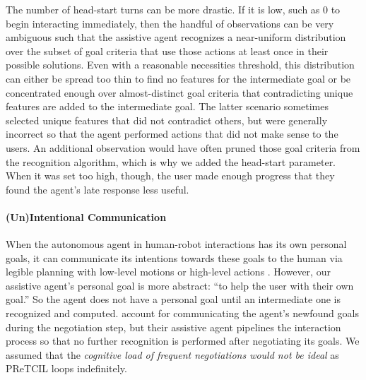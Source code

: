 \documentclass[letterpaper]{article} %
\begin{document}
The number of head-start turns can be more drastic.  If it is low, such as $0$ to begin interacting immediately, then the handful of observations can be very ambiguous such that the assistive agent recognizes a near-uniform distribution over the subset of goal criteria that use those actions at least once in their possible solutions.  Even with a reasonable necessities threshold, this distribution can either be spread too thin to find no features for the intermediate goal or be concentrated enough over almost-distinct goal criteria that contradicting unique features are added to the intermediate goal.  The latter scenario sometimes selected unique features that did not contradict others, but were generally incorrect so that the agent performed actions that did not make sense to the users.  An additional observation would have often pruned those goal criteria from the recognition algorithm, which is why we added the head-start parameter.  When it was set too high, though, the user made enough progress that they found the agent's late response less useful. %



\paragraph{(Un)Intentional Communication} When the autonomous agent in human-robot interactions has its own personal goals, it can communicate its intentions towards these goals to the human via legible planning with low-level motions \cite{Dragan-2013-7732} or high-level actions \cite{DBLP:conf/aaai/KulkarniSK19}.  However, our assistive agent's personal goal is more abstract: ``to help the user with their own goal.''  So the agent does not have a personal goal until an intermediate one is recognized and computed.  \citeauthor{geibPetrick_2016}  account for communicating the agent's newfound goals during the negotiation step, but their assistive agent pipelines the interaction process so that no further recognition is performed after negotiating its goals. %
 We assumed that the \textit{cognitive load of frequent negotiations would not be ideal} as {\sc PReTCIL} loops indefinitely.
\end{document}
